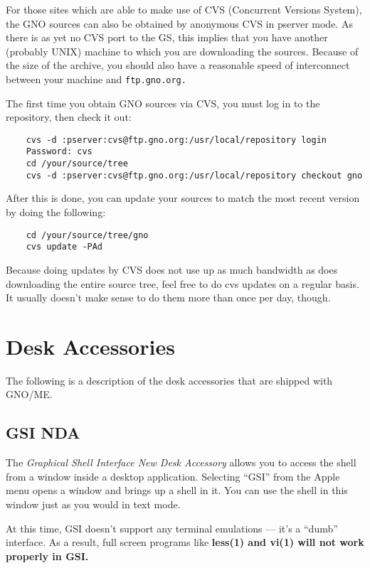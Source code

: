\documentclass{report}
\begin{document}
For those sites which are able to make use of CVS (Concurrent Versions
System), the GNO sources can also be obtained by anonymous CVS in 
pserver mode.  As there is as yet no CVS port to the GS, this implies
that you have another (probably UNIX) machine to which you are downloading
the sources.  Because of the size of the archive, you should also have
a reasonable speed of interconnect between your machine and \tt ftp.gno.org\rm.

The first time you obtain GNO sources via CVS, you must log in to the
repository, then check it out:

\begin{verbatim}
	cvs -d :pserver:cvs@ftp.gno.org:/usr/local/repository login
	Password: cvs
	cd /your/source/tree
	cvs -d :pserver:cvs@ftp.gno.org:/usr/local/repository checkout gno
\end{verbatim}

After this is done, you can update your sources to match the most recent
version by doing the following:

\begin{verbatim}
	cd /your/source/tree/gno
	cvs update -PAd
\end{verbatim}

Because doing updates by CVS does not use up as much bandwidth as 
does downloading the entire source tree, feel free to do cvs updates
on a regular basis.  It usually doesn't make sense to do them more
than once per day, though.

\chapter{Desk Accessories}

The following is a description of the desk
accessories that are shipped with GNO/ME.

\section{GSI NDA}

The \textit{Graphical Shell Interface New Desk Accessory}
allows you to access the shell from a window inside a
desktop application. Selecting ``GSI'' from the Apple menu opens a
window and brings up a shell in it. You can use the shell in this
window just as you would in text mode.

At this time, GSI doesn't support any
terminal emulations --- it's a ``dumb'' interface. As a result,
full screen programs like \bf less\rm(1) and \bf vi\rm(1) will not
work properly in GSI.
\end{document}
